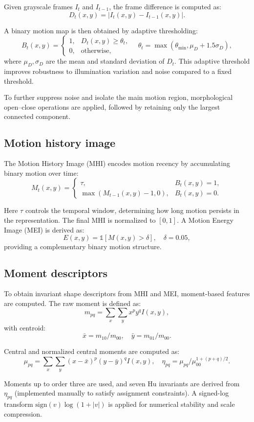 \documentclass[11pt]{article}
\begin{document}
Given grayscale frames $I_t$ and $I_{t-1}$, the frame difference is computed as:
\[
D_t(x,y)=|I_t(x,y)-I_{t-1}(x,y)|.
\]

A binary motion map is then obtained by adaptive thresholding:
\[
B_t(x,y)=
\begin{cases}
1,& D_t(x,y)\ge \theta_t,\\
0,& \text{otherwise},
\end{cases}
\quad
\theta_t=\max(\theta_{\min},\mu_D+1.5\sigma_D),
\]
where $\mu_D,\sigma_D$ are the mean and standard deviation of $D_t$. This adaptive threshold improves robustness to illumination variation and noise compared to a fixed threshold.

To further suppress noise and isolate the main motion region, morphological open--close operations are applied, followed by retaining only the largest connected component.

\subsection{Motion history image}

The Motion History Image (MHI) encodes motion recency by accumulating binary motion over time:
\[
M_t(x,y)=
\begin{cases}
\tau,& B_t(x,y)=1,\\
\max(M_{t-1}(x,y)-1,0),& B_t(x,y)=0.
\end{cases}
\]

Here $\tau$ controls the temporal window, determining how long motion persists in the representation. The final MHI is normalized to $[0,1]$. A Motion Energy Image (MEI) is derived as:
\[
E(x,y)=\mathbb{1}[M(x,y)>\delta],\quad \delta=0.05,
\]
providing a complementary binary motion structure.

\subsection{Moment descriptors}

To obtain invariant shape descriptors from MHI and MEI, moment-based features are computed. The raw moment is defined as:
\[
m_{pq}=\sum_x\sum_y x^p y^q I(x,y),
\]
with centroid:
\[
\bar{x}=m_{10}/m_{00},\quad \bar{y}=m_{01}/m_{00}.
\]

Central and normalized central moments are computed as:
\[
\mu_{pq}=\sum_x\sum_y(x-\bar{x})^p(y-\bar{y})^qI(x,y), \quad
\eta_{pq}=\mu_{pq}/\mu_{00}^{1+(p+q)/2}.
\]

Moments up to order three are used, and seven Hu invariants are derived from $\eta_{pq}$ (implemented manually to satisfy assignment constraints). A signed-log transform $\text{sign}(v)\log(1+|v|)$ is applied for numerical stability and scale compression.
\end{document}
